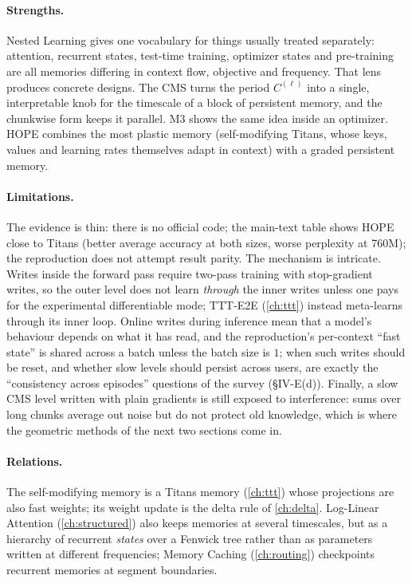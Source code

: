 \paragraph{Strengths.} Nested Learning gives one vocabulary for things usually treated
separately: attention, recurrent states, test-time training, optimizer states and pre-training
are all memories differing in context flow, objective and frequency. That lens produces concrete
designs. The CMS turns the period $C^{(\ell)}$ into a single, interpretable knob for the
timescale of a block of persistent memory, and the chunkwise form keeps it parallel. M3 shows the
same idea inside an optimizer. HOPE combines the most plastic memory (self-modifying Titans, whose
keys, values and learning rates themselves adapt in context) with a graded persistent memory.

\paragraph{Limitations.} The evidence is thin: there is no official code; the main-text table
shows HOPE close to Titans (better average accuracy at both sizes, worse perplexity at 760M); the
reproduction does not attempt result parity. The mechanism is intricate. Writes inside the
forward pass require two-pass training with stop-gradient writes, so the outer level does not
learn \emph{through} the inner writes unless one pays for the experimental differentiable mode;
TTT-E2E (\cref{ch:ttt}) instead meta-learns through its inner loop. Online writes during
inference mean that a model's behaviour depends on what it has read, and the reproduction's
per-context ``fast state'' is shared across a batch unless the batch size is $1$; when such
writes should be reset, and whether slow levels should persist across users, are exactly the
``consistency across episodes'' questions of the survey (\S IV-E(d)). Finally, a slow CMS level
written with plain gradients is still exposed to interference: sums over long chunks average out
noise but do not protect old knowledge, which is where the geometric methods of the next two
sections come in.

\paragraph{Relations.} The self-modifying memory is a Titans memory (\cref{ch:ttt}) whose
projections are also fast weights; its weight update is the delta rule of \cref{ch:delta}.
Log-Linear Attention (\cref{ch:structured}) also keeps memories at several timescales, but as a
hierarchy of recurrent \emph{states} over a Fenwick tree rather than as parameters written at
different frequencies; Memory Caching (\cref{ch:routing}) checkpoints recurrent memories at
segment boundaries.

